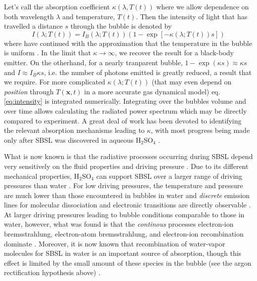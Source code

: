 \documentclass[prb,aps,nofootinbib,superscriptaddress,floatfix]{revtex4-2}
\begin{document}
Let's call the absorption coefficient $\kappa(\lambda,T(t))$ where we allow dependence on both wavelength $\lambda$ and temperature, $T(t)$. Then the intensity of light that has travelled a distance $s$ through the bubble is denoted by \cite{zel2002physics,hilgenfeldt1999simple,taylor1969experimental}
\begin{equation}
    I(\lambda;T(t))=I_{B}(\lambda;T(t))  \left( 1-\exp \left[ -\kappa(\lambda;T(t)) s \right] \right)
    \label{eq:intensity}
\end{equation}
where have continued with the approximation that the temperature in the bubble is uniform \cite{hilgenfeldt1999sonoluminescence,hilgenfeldt1999simple}. In the limit that $\kappa\rightarrow\infty$, we recover the result for a black-body emitter. On the otherhand, for a nearly tranparent bubble, $1-\exp(\kappa s)\approx\kappa s$ and $I\approx I_B \kappa s$, i.e. the number of photons emitted is greatly reduced, a result that we require. For more complicated $\kappa(\lambda;T(t))$ (that may even depend on \emph{position} through $T(\bm{x},t)$ in a more accurate gas dynamical model) eq. \ref{eq:intensity} is integrated numerically. Integrating over the bubbles volume and over time allows calculating the radiated power spectrum which may be directly compared to experiment. A great deal of work has been devoted to identifying the relevant absorption mechanisms leading to $\kappa$, with most progress being made only after SBSL was discovered in aqueous H$_2$SO$_4$ \cite{hilgenfeldt1999simple,brenner2002single,hilgenfeldt1999sonoluminescence,yasui1999mechanism,flannigan2005plasma,flannigan2006measurement,suslick2008inside,an2009diagnosing,an2008spectral,an2006mechanism}. 

What is now known is that the radiative processes occurring during SBSL depend very sensitively on the fluid properties and driving pressure \cite{flannigan2006measurement,flannigan2005plasma}. Due to its different mechanical properties, H$_2$SO$_4$ can support SBSL over a larger range of driving pressures than water \cite{an2009diagnosing}. For low driving pressures, the temperature and pressure are much lower than those encountered in bubbles in water and \emph{discrete} emission lines for molecular dissociation and electronic transitions are directly observable \cite{flannigan2005plasma,flannigan2006measurement}. At larger driving pressures leading to bubble conditions comparable to those in water, however, what was found is that the \emph{continous} processes electron-ion bremsstrahlung, electron-atom bremsstrahlung, and electron-ion recombination dominate \cite{hilgenfeldt1999simple,yasui2018acoustic,suslick2008inside,zel2002physics}. Moreover, it is now known that recombination of water-vapor molecules for SBSL in water is an important source of absorption, though this effect is limited by the small amount of these species in the bubble (see the argon rectification hypothesis above) \cite{an2006mechanism}. 
\end{document}
